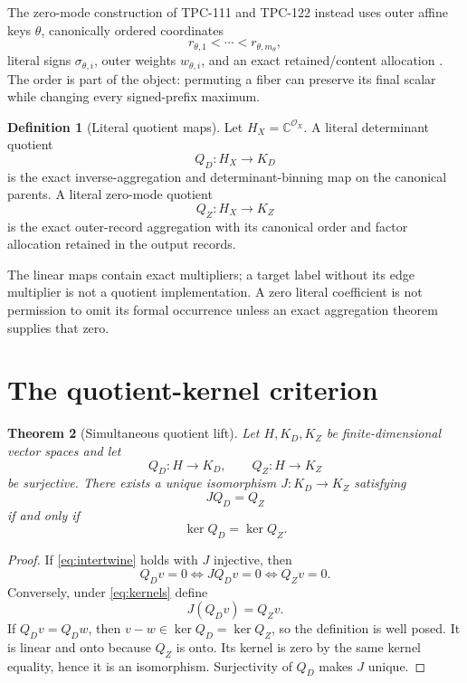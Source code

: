 \documentclass[11pt]{article}
\newtheorem{theorem}{Theorem}[section]
\theoremstyle{definition}
\newtheorem{definition}[theorem]{Definition}
\theoremstyle{remark}
\begin{document}
The zero-mode construction of TPC-111 and TPC-122 instead uses outer
affine keys \(\theta\), canonically ordered coordinates
\[
 r_{\theta,1}<\cdots<r_{\theta,m_\theta},
\]
literal signs \(\sigma_{\theta,i}\), outer weights
\(w_{\theta,i}\), and an exact retained/content allocation
\citep{WangTPC111,WangTPC122}.  The order is part of the object:
permuting a fiber can preserve its final scalar while changing every
signed-prefix maximum.

\begin{definition}[Literal quotient maps]
Let \(H_X=\mathbb C^{\mathcal O_X}\).  A literal determinant quotient
\[
 Q_D:H_X\longrightarrow K_D
\]
is the exact inverse-aggregation and determinant-binning map on the
canonical parents.  A literal zero-mode quotient
\[
 Q_Z:H_X\longrightarrow K_Z
\]
is the exact outer-record aggregation with its canonical order and
factor allocation retained in the output records.
\end{definition}

The linear maps contain exact multipliers; a target label without its
edge multiplier is not a quotient implementation.  A zero literal
coefficient is not permission to omit its formal occurrence unless an
exact aggregation theorem supplies that zero.

\section{The quotient-kernel criterion}

\begin{theorem}[Simultaneous quotient lift]
\label{thm:kernel}
Let \(H,K_D,K_Z\) be finite-dimensional vector spaces and let
\[
 Q_D:H\to K_D,\qquad Q_Z:H\to K_Z
\]
be surjective.  There exists a unique isomorphism
\(J:K_D\to K_Z\) satisfying
\begin{equation}
 JQ_D=Q_Z
 \label{eq:intertwine}
\end{equation}
if and only if
\begin{equation}
 \boxed{\ker Q_D=\ker Q_Z.}
 \label{eq:kernels}
\end{equation}
\end{theorem}

\begin{proof}
If \eqref{eq:intertwine} holds with \(J\) injective, then
\[
 Q_Dv=0\iff JQ_Dv=0\iff Q_Zv=0.
\]
Conversely, under \eqref{eq:kernels} define
\[
 J(Q_Dv)=Q_Zv.
\]
If \(Q_Dv=Q_Dw\), then \(v-w\in\ker Q_D=\ker Q_Z\), so the definition
is well posed.  It is linear and onto because \(Q_Z\) is onto.  Its
kernel is zero by the same kernel equality, hence it is an
isomorphism.  Surjectivity of \(Q_D\) makes \(J\) unique.
\end{proof}
\end{document}

